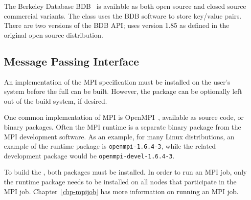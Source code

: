 The Berkeley Database {BDB}~\cite{berkeleydb} is available as both open source
and closed source commercial variants. The \sname class
 uses the BDB software to store key/value pairs.
There are two versions of the BDB API; \sname uses version 1.85 as defined in
the original open source distribution.

\subsection{Message Passing Interface}

An implementation of the MPI specification must be installed on the user's
system before the full \sname can be built. However, the  package
can be optionally left out of the \sname build system, if desired.

One common implementation of MPI is OpenMPI~\cite{openmpi}, available as source
code, or binary packages. Often the MPI runtime is a separate binary package
from the MPI development software. As an example, for many Linux distributions,
an example of the runtime package is \texttt{openmpi-1.6.4-3}, while
the related development package would be \texttt{openmpi-devel-1.6.4-3}.

To build the \sname, both packages must be installed. In order to run an MPI
job, only the runtime package needs to be installed on all nodes that
participate in the MPI job. Chapter~\ref{chp-mpijob} has more information on
running an MPI job.
